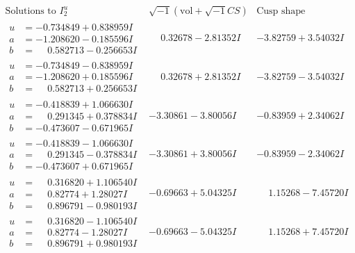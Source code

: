 \documentclass[1p]{elsarticle_modified}
\theoremstyle{definition}
\newcommand{\I}{\sqrt{-1}}
\begin{document}
$$\begin{array}{c|c|c}  
\text{Solutions to }I^u_{2}& \I (\text{vol} + \sqrt{-1}CS) & \text{Cusp shape}\\
 \hline 
\begin{aligned}
u &= -0.734849 + 0.838959 I \\
a &= -1.208620 - 0.185596 I \\
b &= \phantom{-}0.582713 - 0.256653 I\end{aligned}
 & \phantom{-}0.32678 - 2.81352 I & -3.82759 + 3.54032 I \\ \hline\begin{aligned}
u &= -0.734849 - 0.838959 I \\
a &= -1.208620 + 0.185596 I \\
b &= \phantom{-}0.582713 + 0.256653 I\end{aligned}
 & \phantom{-}0.32678 + 2.81352 I & -3.82759 - 3.54032 I \\ \hline\begin{aligned}
u &= -0.418839 + 1.066630 I \\
a &= \phantom{-}0.291345 + 0.378834 I \\
b &= -0.473607 - 0.671965 I\end{aligned}
 & -3.30861 - 3.80056 I & -0.83959 + 2.34062 I \\ \hline\begin{aligned}
u &= -0.418839 - 1.066630 I \\
a &= \phantom{-}0.291345 - 0.378834 I \\
b &= -0.473607 + 0.671965 I\end{aligned}
 & -3.30861 + 3.80056 I & -0.83959 - 2.34062 I \\ \hline\begin{aligned}
u &= \phantom{-}0.316820 + 1.106540 I \\
a &= \phantom{-}0.82774 + 1.28027 I \\
b &= \phantom{-}0.896791 - 0.980193 I\end{aligned}
 & -0.69663 + 5.04325 I & \phantom{-}1.15268 - 7.45720 I \\ \hline\begin{aligned}
u &= \phantom{-}0.316820 - 1.106540 I \\
a &= \phantom{-}0.82774 - 1.28027 I \\
b &= \phantom{-}0.896791 + 0.980193 I\end{aligned}
 & -0.69663 - 5.04325 I & \phantom{-}1.15268 + 7.45720 I \\ \hline\begin{aligned}

\end{aligned}
\end{array}$$
\end{document}
